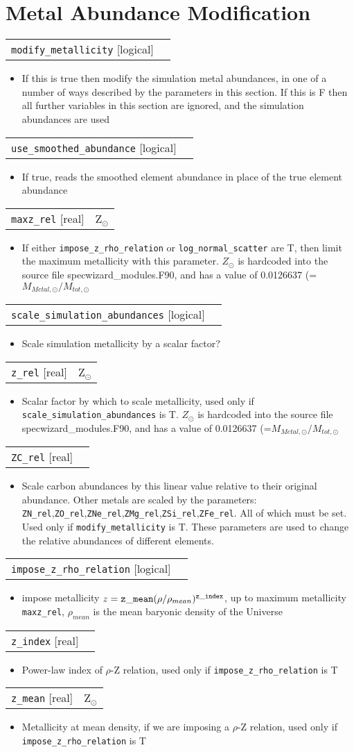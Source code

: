 \documentclass{report}
\makeatletter
\newcommand{\paramdefinition}[3]{
\begin{tabular*}{\textwidth}{l@{\extracolsep{\fill}}r}
		{\tt #1} [{\sc #2}]& #3 \\
\end{tabular*}}
\newcommand{\paramdescription}[1]{
\begin{itemize}
\item #1
\end{itemize}\vspace{0.2cm}}
\makeatother
\begin{document}
\section{Metal Abundance Modification}
\paramdefinition{modify\_metallicity}{logical}{ }
\paramdescription{If this is true then modify the simulation metal abundances, in one of a number of ways described by the parameters in this section.  If this is F then all further variables in this section are ignored, and the simulation abundances are used}

\paramdefinition{use\_smoothed\_abundance}{logical}{}
\paramdescription{If true, reads the smoothed element abundance in place of the true element abundance}

\paramdefinition{maxz\_rel}{real}{Z$_{\odot}$}
\paramdescription{If either {\tt impose\_z\_rho\_relation} or {\tt log\_normal\_scatter} are T, then limit the maximum metallicity with this parameter.  $Z_{\odot}$ is hardcoded into the source file specwizard\_modules.F90, and has a value of 0.0126637  (=$M_{Metal,\odot}/M_{tot,\odot}$}

\paramdefinition{scale\_simulation\_abundances}{logical}{ }
\paramdescription{Scale simulation metallicity by a scalar factor?}

\paramdefinition{z\_rel}{real}{Z$_{\odot}$}
\paramdescription{Scalar factor by which to scale metallicity, used only if {\tt scale\_simulation\_abundances} is T.   $Z_{\odot}$ is hardcoded into the source file specwizard\_modules.F90, and has a value of 0.0126637  (=$M_{Metal,\odot}/M_{tot,\odot}$}

\paramdefinition{ZC\_rel}{real}{}
\paramdescription{Scale carbon abundances by this linear value relative to their original abundance.  Other metals are scaled by the parameters: {\tt ZN\_rel},{\tt ZO\_rel},{\tt ZNe\_rel},{\tt ZMg\_rel},{\tt ZSi\_rel},{\tt ZFe\_rel}.  All of which must be set.  Used only if {\tt modify\_metallicity} is T.  These parameters are used to change the relative abundances of different elements.}

\paramdefinition{impose\_z\_rho\_relation}{logical}{ }
\paramdescription{ impose metallicity $z = {\tt z\_mean} (\rho/\rho_{mean})^{{\tt z\_index}}$, up to maximum metallicity {\tt maxz\_rel}, $\rho_{mean}$ is the mean baryonic density of the Universe}

\paramdefinition{z\_index}{real}{ }
\paramdescription{Power-law index of $\rho$-Z relation, used only if {\tt impose\_z\_rho\_relation} is T}

\paramdefinition{z\_mean}{real}{Z$_{\odot}$}
\paramdescription{Metallicity at mean density, if we are imposing a $\rho$-Z relation, used only if {\tt impose\_z\_rho\_relation} is T}
\end{document}
